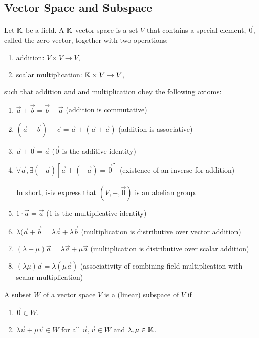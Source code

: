 \subsection{Vector Space and Subspace}
\begin{definition}
    Let $\mathbb{K}$ be a field. A $\mathbb{K}$-vector space is a set $V$ that contains a special element, $\vec{0}$, called the zero vector,
    together with two operations:
    \begin{enumerate}
        \item addition: $V \times V \to V$,
        \item scalar multiplication: $\mathbb{K} \times V \to V$,
    \end{enumerate}
    such that addition and and multiplication obey the following axioms:
    \begin{enumerate}[label=\roman*)]
        \item $\vec{a}+\vec{b} = \vec{b}+\vec{a}$ \hfill (addition is commutative)
        \item $(\vec{a} + \vec{b}) + \vec{c} = \vec{a} + (\vec{a} + \vec{c})$ \hfill (addition is associative)
        \item $\vec{a} + \vec{0} = \vec{a}$ \hfill ($\vec{0}$ is the additive identity)
        \item $\forall \vec{a}, \exists (-\vec{a}) [\vec{a}+(-\vec{a}) = \vec{0}]$ \hfill (existence of an inverse for addition) 

            In short, i-iv express that $(V, + , \vec{0})$ is an abelian group.
        \item $1\cdot\vec{a} = \vec{a}$ \hfill ($1$ is the multiplicative identity)
        \item $\lambda(\vec{a}+\vec{b} = \lambda\vec{a} + \lambda\vec{b}$ \hfill (multiplication is distributive over vector addition)
        \item $(\lambda + \mu)\vec{a} = \lambda\vec{a} + \mu\vec{a}$ \hfill (multiplication is distributive over scalar addition)
        \item $(\lambda\mu)\vec{a} = \lambda(\mu\vec{a})$ \hfill (associativity of combining field multiplication with scalar multiplication)
    \end{enumerate}
\end{definition}

\begin{definition}[Subspace]
    A subset $W$ of a vector space $V$ is a (linear) subspace of $V$ if 
    \begin{enumerate}
        \item $\vec{0} \in W$.
        \item $\lambda\vec{u} + \mu\vec{v} \in W$ for all $\vec{u}, \vec{v} \in W$ and $\lambda, \mu \in \mathbb{K}$.
    \end{enumerate}
\end{definition}

